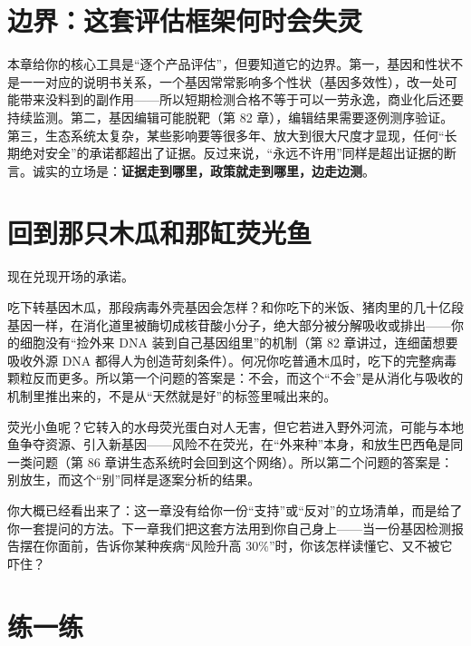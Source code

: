 \section{边界：这套评估框架何时会失灵}

本章给你的核心工具是“逐个产品评估”，但要知道它的边界。第一，基因和性状不是一一对应的说明书关系，一个基因常常影响多个性状（基因多效性），改一处可能带来没料到的副作用——所以短期检测合格不等于可以一劳永逸，商业化后还要持续监测。第二，基因编辑可能脱靶（第 82 章），编辑结果需要逐例测序验证。第三，生态系统太复杂，某些影响要等很多年、放大到很大尺度才显现，任何“长期绝对安全”的承诺都超出了证据。反过来说，“永远不许用”同样是超出证据的断言。诚实的立场是：\textbf{证据走到哪里，政策就走到哪里，边走边测}。

\section{回到那只木瓜和那缸荧光鱼}

现在兑现开场的承诺。

吃下转基因木瓜，那段病毒外壳基因会怎样？和你吃下的米饭、猪肉里的几十亿段基因一样，在消化道里被酶切成核苷酸小分子，绝大部分被分解吸收或排出——你的细胞没有“捡外来 DNA 装到自己基因组里”的机制（第 82 章讲过，连细菌想要吸收外源 DNA 都得人为创造苛刻条件）。何况你吃普通木瓜时，吃下的完整病毒颗粒反而更多。所以第一个问题的答案是：不会，而这个“不会”是从消化与吸收的机制里推出来的，不是从“天然就是好”的标签里喊出来的。

荧光小鱼呢？它转入的水母荧光蛋白对人无害，但它若进入野外河流，可能与本地鱼争夺资源、引入新基因——风险不在荧光，在“外来种”本身，和放生巴西龟是同一类问题（第 86 章讲生态系统时会回到这个网络）。所以第二个问题的答案是：别放生，而这个“别”同样是逐案分析的结果。

你大概已经看出来了：这一章没有给你一份“支持”或“反对”的立场清单，而是给了你一套提问的方法。下一章我们把这套方法用到你自己身上——当一份基因检测报告摆在你面前，告诉你某种疾病“风险升高 $30\%$”时，你该怎样读懂它、又不被它吓住？

\section*{练一练}

